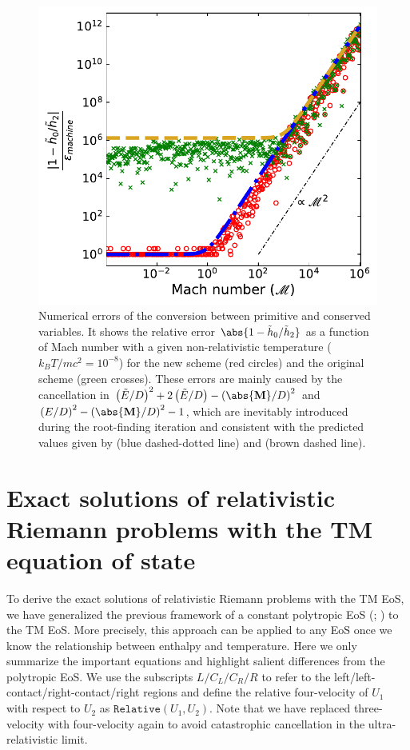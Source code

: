 \begin{figure}
\includegraphics[scale=0.8]{srhd-figures/ErrorMap3.pdf}
\caption{Numerical errors of the conversion between primitive and conserved variables. It shows the relative error $\abs{1-\tilde{h}_{0}/\tilde{h}_{2}}$ as a function of Mach number with a given non-relativistic temperature ($k_{B}T/mc^2=10^{-8}$) for the new scheme (red circles) and the original scheme (green crosses). These errors are mainly caused by the cancellation in $\left(\tilde{E}/D\right)^2+2\left(\tilde{E}/D\right)-\left(\abs{\mathbf{M}}/D\right)^2$ and $\left(E/D\right)^2-\left(\abs{\mathbf{M}}/D\right)^2-1$, which are inevitably introduced during the root-finding iteration and consistent with the predicted values given by  (blue dashed-dotted line) and (brown dashed line).}
\label{fig:ErrorAnalysis}
\end{figure}


\section{Exact solutions of relativistic Riemann problems with the TM equation of state}
\label{appendix:exact solution}
To derive the exact solutions of relativistic Riemann problems with the TM EoS, we have generalized the previous framework of a constant polytropic EoS (\citealt{Marti1994}; \citealt{REZZOLLA2001}) to the TM EoS. More precisely, this approach can be applied to any EoS once we know the relationship between enthalpy and temperature. Here we only summarize the important equations and highlight salient differences from the polytropic EoS. We use the subscripts $L/C_{L}/C_{R}/R$ to refer to the left/left-contact/right-contact/right regions and define the relative four-velocity of $U_{1}$ with respect to $U_{2}$ as $\texttt{Relative}(U_{1}, U_{2})$. Note that we have replaced three-velocity with four-velocity again to avoid catastrophic cancellation in the ultra-relativistic limit.

